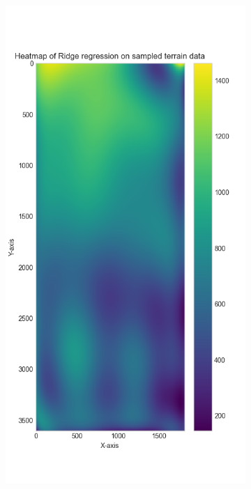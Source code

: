 \begin{figure}[H]
\begin{subfigure}[h]{0.23\textwidth}
         \label{fig:ols heatmap}
     \end{subfigure}
     \hfill
     \begin{subfigure}[h]{0.23\textwidth}
         \includegraphics[width=\textwidth]{Images/ridge_terrain_heatmap.png}

\end{subfigure}
\end{figure}
